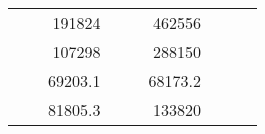 \begin{table}[H]
\begin{tabular}{|ccrccrccc}
\multicolumn{1}{|c|}{\cellcolor[HTML]{FFFFC7}}                                & \multicolumn{1}{c|}{\cellcolor[HTML]{DDFDFF}}                      & \multicolumn{1}{r|}{\cellcolor[HTML]{DAE8FC}191824}    & \multicolumn{1}{c|}{\cellcolor[HTML]{FFFFC7}}                                & \multicolumn{1}{c|}{\cellcolor[HTML]{DDFDFF}}                       & \multicolumn{1}{r|}{\cellcolor[HTML]{DDFDFF}462556}    &                                                                              &                                                                    &                                                        \\ \cline{3-3} \cline{6-6}
\multicolumn{1}{|c|}{\cellcolor[HTML]{FFFFC7}}                                & \multicolumn{1}{c|}{\cellcolor[HTML]{DDFDFF}}                      & \multicolumn{1}{r|}{\cellcolor[HTML]{DDFDFF}107298}    & \multicolumn{1}{c|}{\cellcolor[HTML]{FFFFC7}}                                & \multicolumn{1}{c|}{\cellcolor[HTML]{DDFDFF}}                       & \multicolumn{1}{r|}{\cellcolor[HTML]{DAE8FC}288150}    &                                                                              &                                                                    &                                                        \\ \cline{3-3} \cline{6-6}
\multicolumn{1}{|c|}{\cellcolor[HTML]{FFFFC7}}                                & \multicolumn{1}{c|}{\cellcolor[HTML]{DDFDFF}}                      & \multicolumn{1}{r|}{\cellcolor[HTML]{DAE8FC}69203.1}   & \multicolumn{1}{c|}{\cellcolor[HTML]{FFFFC7}}                                & \multicolumn{1}{c|}{\cellcolor[HTML]{DDFDFF}}                       & \multicolumn{1}{r|}{\cellcolor[HTML]{DDFDFF}68173.2}   &                                                                              &                                                                    &                                                        \\ \cline{3-3} \cline{6-6}
\multicolumn{1}{|c|}{\cellcolor[HTML]{FFFFC7}}                                & \multicolumn{1}{c|}{\cellcolor[HTML]{DDFDFF}}                      & \multicolumn{1}{r|}{\cellcolor[HTML]{DDFDFF}81805.3}   & \multicolumn{1}{c|}{\cellcolor[HTML]{FFFFC7}}                                & \multicolumn{1}{c|}{\cellcolor[HTML]{DDFDFF}}                       & \multicolumn{1}{r|}{\cellcolor[HTML]{DAE8FC}133820}    &                                                                              &                                                                    &                                                        \\ \cline{3-3} \cline{6-6}

\end{tabular}
\end{table}
